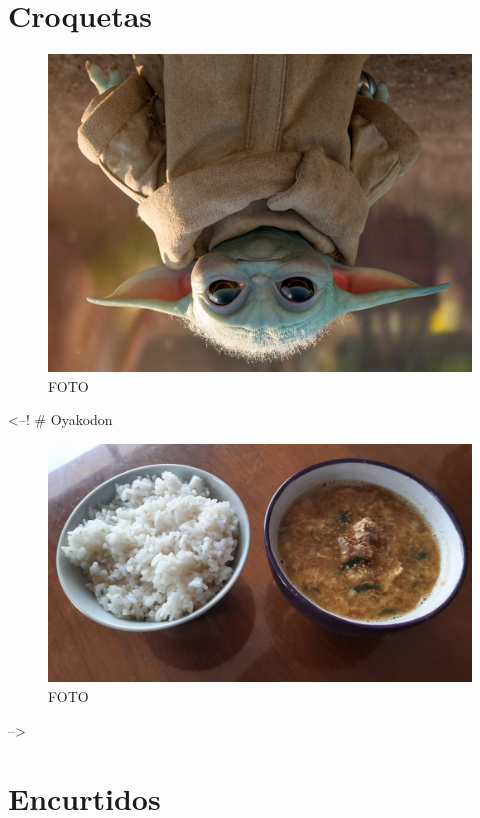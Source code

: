 \documentclass[
]{book}
\begin{document}
\hypertarget{croquetas}{%
\chapter{Croquetas}\label{croquetas}}

\begin{figure}
\centering
\includegraphics{images/grogu.png}
\caption{FOTO}
\end{figure}

\textless--! \# Oyakodon

\begin{figure}
\centering
\includegraphics{images/oyakodon.jpeg}
\caption{FOTO}
\end{figure}

--\textgreater{}

\hypertarget{encurtidos}{%
\chapter{Encurtidos}\label{encurtidos}}
\end{document}
